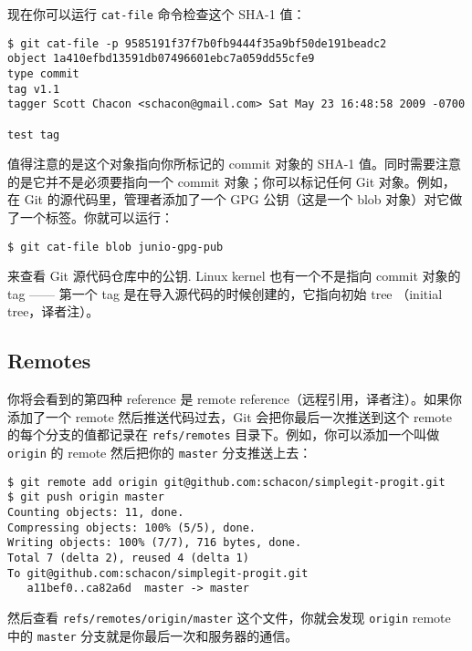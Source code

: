 \documentclass[a4paper]{book}
\begin{document}
现在你可以运行 \texttt{cat-file} 命令检查这个 SHA-1 值：

\begin{shaded}\begin{verbatim}
$ git cat-file -p 9585191f37f7b0fb9444f35a9bf50de191beadc2
object 1a410efbd13591db07496601ebc7a059dd55cfe9
type commit
tag v1.1
tagger Scott Chacon <schacon@gmail.com> Sat May 23 16:48:58 2009 -0700

test tag
\end{verbatim}\end{shaded}

值得注意的是这个对象指向你所标记的 commit 对象的 SHA-1 值。同时需要注意的是它并不是必须要指向一个 commit 对象；你可以标记任何 Git 对象。例如，在 Git 的源代码里，管理者添加了一个 GPG 公钥（这是一个 blob 对象）对它做了一个标签。你就可以运行：

\begin{shaded}\begin{verbatim}
$ git cat-file blob junio-gpg-pub
\end{verbatim}\end{shaded}

来查看 Git 源代码仓库中的公钥. Linux kernel 也有一个不是指向 commit 对象的 tag ------ 第一个 tag 是在导入源代码的时候创建的，它指向初始 tree （initial tree，译者注）。

\subsection{Remotes}

你将会看到的第四种 reference 是 remote reference（远程引用，译者注）。如果你添加了一个 remote 然后推送代码过去，Git 会把你最后一次推送到这个 remote 的每个分支的值都记录在 \texttt{refs/remotes} 目录下。例如，你可以添加一个叫做 \texttt{origin} 的 remote 然后把你的 \texttt{master} 分支推送上去：

\begin{shaded}\begin{verbatim}
$ git remote add origin git@github.com:schacon/simplegit-progit.git
$ git push origin master
Counting objects: 11, done.
Compressing objects: 100% (5/5), done.
Writing objects: 100% (7/7), 716 bytes, done.
Total 7 (delta 2), reused 4 (delta 1)
To git@github.com:schacon/simplegit-progit.git
   a11bef0..ca82a6d  master -> master
\end{verbatim}\end{shaded}

然后查看 \texttt{refs/remotes/origin/master} 这个文件，你就会发现 \texttt{origin} remote 中的 \texttt{master} 分支就是你最后一次和服务器的通信。
\end{document}
